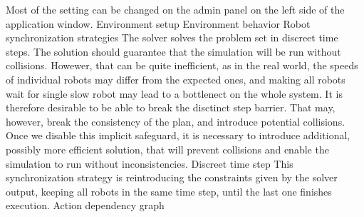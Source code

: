 \fleetControlAdminPanel
Most of the setting can be changed on the admin panel on the left side of the application window.
\sec Environment setup
\sec Environment behavior
\br\br
\sec Robot synchronization strategies
The solver solves the problem set in discreet time steps. The solution should guarantee that the simulation will be run without collisions. Howewer, that can be quite inefficient, as in the real world, the speeds of individual robots may differ from the expected ones, and making all robots wait for single slow robot may lead to a bottlenect on the whole system. It is therefore desirable to be able to break the disctinct step barrier. That may, however, break the consistency of the plan, and introduce potential collisions. Once we disable this implicit safeguard, it is necessary to introduce additional, possibly more efficient solution, that will prevent collisions and enable the simulation to run without inconsistencies.
\secc Discreet time step
This synchronization strategy is reintroducing the constraints given by the solver output, keeping all robots in the same time step, until the last one finishes execution.
\vfil \break
\secc Action dependency graph
